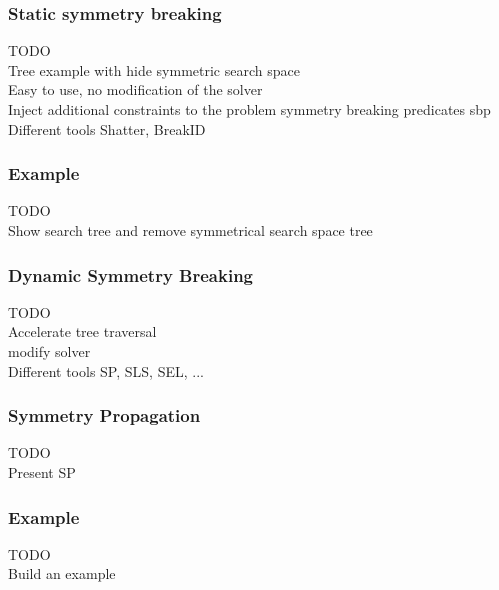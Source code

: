 \documentclass{beamer}
\begin{document}
\begin{frame}
	\frametitle{Static symmetry breaking}
	TODO\\
	
	Tree example with hide symmetric search space\\
	
	Easy to use, no modification of the solver \\
	
	Inject additional constraints to the problem symmetry breaking predicates sbp\\
	
Different tools Shatter, BreakID
\end{frame}



\begin{frame}
\frametitle{Example}
TODO\\

Show search tree and remove symmetrical search space tree

\end{frame}

\begin{frame}
\frametitle{Dynamic Symmetry Breaking}
TODO\\

Accelerate tree traversal\\

modify solver \\

Different tools SP, SLS, SEL, ...
\end{frame}
\begin{frame}
\frametitle{Symmetry Propagation}
TODO\\
Present SP
\end{frame}

\begin{frame}
\frametitle{Example}
TODO\\
Build an example
\end{frame}
\end{document}
